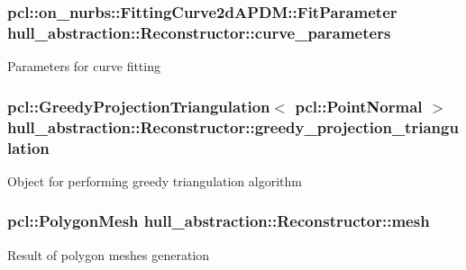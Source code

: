 \subsubsection[{\texorpdfstring{curve\+\_\+parameters}{curve_parameters}}]{\setlength{\rightskip}{0pt plus 5cm}pcl\+::on\+\_\+nurbs\+::\+Fitting\+Curve2d\+A\+P\+D\+M\+::\+Fit\+Parameter hull\+\_\+abstraction\+::\+Reconstructor\+::curve\+\_\+parameters\hspace{0.3cm}{\ttfamily [private]}}\hypertarget{classhull__abstraction_1_1_reconstructor_af7033918ae29ef20bdd6d3db10175fd7}{}\label{classhull__abstraction_1_1_reconstructor_af7033918ae29ef20bdd6d3db10175fd7}
Parameters for curve fitting 
\subsubsection[{\texorpdfstring{greedy\+\_\+projection\+\_\+triangulation}{greedy_projection_triangulation}}]{\setlength{\rightskip}{0pt plus 5cm}pcl\+::\+Greedy\+Projection\+Triangulation$<$ pcl\+::\+Point\+Normal $>$ hull\+\_\+abstraction\+::\+Reconstructor\+::greedy\+\_\+projection\+\_\+triangulation\hspace{0.3cm}{\ttfamily [private]}}\hypertarget{classhull__abstraction_1_1_reconstructor_aeb53b00a5a6300f6fcbef59d6759f01b}{}\label{classhull__abstraction_1_1_reconstructor_aeb53b00a5a6300f6fcbef59d6759f01b}
Object for performing greedy triangulation algorithm 
\subsubsection[{\texorpdfstring{mesh}{mesh}}]{\setlength{\rightskip}{0pt plus 5cm}pcl\+::\+Polygon\+Mesh hull\+\_\+abstraction\+::\+Reconstructor\+::mesh\hspace{0.3cm}{\ttfamily [private]}}\hypertarget{classhull__abstraction_1_1_reconstructor_af0818936b15dd13f3a9fa3e70734cd57}{}\label{classhull__abstraction_1_1_reconstructor_af0818936b15dd13f3a9fa3e70734cd57}
Result of polygon meshes generation 
